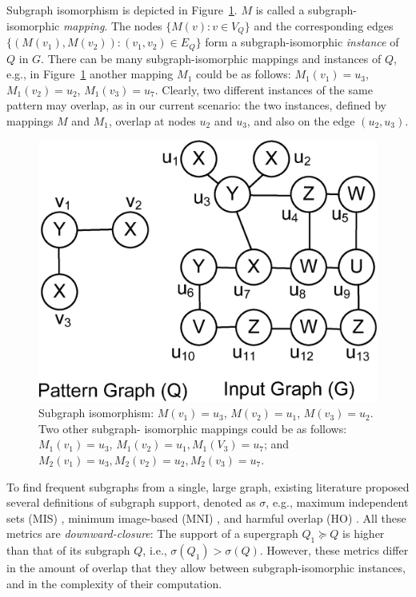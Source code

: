 Subgraph isomorphism is depicted in Figure~\ref{fig:subgraph_isomorphism}. $M$ is called a subgraph-isomorphic
{\em mapping}. The nodes $\{M(v):v\in V_Q\}$ and the corresponding edges $\{(M(v_1),M(v_2)):(v_1,v_2)\in E_Q\}$
form a subgraph-isomorphic {\em instance} of $Q$ in $G$.
There can be many subgraph-isomorphic mappings and instances of $Q$, e.g., in Figure~\ref{fig:subgraph_isomorphism}
another mapping $M_1$ could be as follows: $M_1(v_1)= u_3$, $M_1(v_2)= u_2$, $M_1(v_3)= u_7$. Clearly, two different
instances of the same pattern may overlap, as in our current scenario: the two instances, defined by mappings $M$
and $M_1$, overlap at nodes $u_2$ and $u_3$,
and also on the edge $(u_2,u_3)$.
%
\begin{figure}
\centering
\includegraphics[scale=0.23]{images/subgraph_isomorphism}
\vspace{-2mm}
\caption{\small Subgraph isomorphism: $M(v_1)= u_3$, $M(v_2)= u_1$, $M(v_3)= u_2$. Two other subgraph-
isomorphic mappings could be as follows: $M_1(v_1)=u_3$, $M_1(v_2)=u_1, M_1(V_3)=u_7$; and
$M_2(v_1)=u_3, M_2(v_2)=u_2, M_2(v_3)=u_7$.}
\label{fig:subgraph_isomorphism}
\vspace{-5mm}
\end{figure}

To find frequent subgraphs from a single, large graph, existing literature 
proposed several definitions of subgraph support, denoted as $\sigma$, e.g., maximum independent sets (MIS) \cite{KK04}, 
minimum image-based (MNI) \cite{BN08}, and harmful overlap (HO) \cite{FB07}.
All these metrics are {\em downward-closure}: The support of a supergraph 
$Q_1 \succeq Q$ is higher than that of its subgraph $Q$, i.e., $\sigma(Q_1) > \sigma(Q)$.
However, these metrics differ in the amount of overlap that they allow between subgraph-isomorphic 
instances, and in the complexity of their computation.

